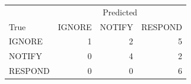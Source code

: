 \begin{tabular}{lrrr}
\toprule
 & \multicolumn{3}{c}{Predicted} \\
True & IGNORE & NOTIFY & RESPOND \\
\midrule
IGNORE & 1 & 2 & 5 \\
NOTIFY & 0 & 4 & 2 \\
RESPOND & 0 & 0 & 6 \\
\bottomrule
\end{tabular}

